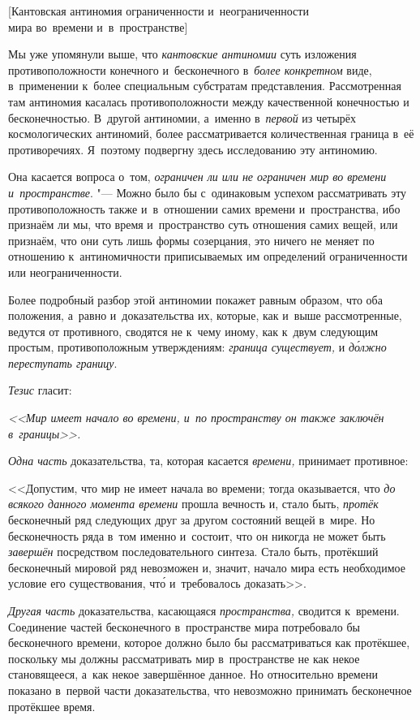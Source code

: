 %
{[Кантовская антиномия ограниченности и~неограниченности\nopagebreak\\
мира во~времени и~в~пространстве]}

Мы уже упомянули выше, что {\em кантовские антиномии} суть изложения
противоположности конечного и~бесконечного в~{\em более конкретном} виде,
в~применении к~более специальным субстратам представления. Рассмотренная там
антиномия касалась противоположности между качественной конечностью и
бесконечностью. В~другой антиномии, а~именно в~{\em первой} из четырёх
космологических антиномий, более рассматривается количественная граница в~её
противоречиях. Я~поэтому подвергну здесь исследованию эту антиномию.

Она касается вопроса о~том,
{\em ограничен ли или не ограничен мир во времени и~пространстве}. "--- Можно
было бы с~одинаковым успехом рассматривать эту противоположность также
и~в~отношении самих времени и~пространства, ибо признаём ли мы, что время
и~пространство суть отношения самих вещей, или признаём, что они суть лишь
формы созерцания, это ничего не меняет по отношению к~антиномичности
приписываемых им определений ограниченности или неограниченности.

Более подробный разбор этой антиномии покажет равным образом, что оба
положения, а~равно и~доказательства их, которые, как и~выше рассмотренные,
ведутся от противного, сводятся не к~чему иному, как к~двум следующим простым,
противоположным утверждениям: {\em граница существует,} и
{\em д\'{о}лжно переступать границу}.

{\em Тезис} гласит:

{\em <<Мир имеет начало во времени, и~по пространству он
также заключён в~границы>>.}

{\em Одна часть} доказательства, та, которая касается
{\em времени,} принимает противное:

<<Допустим, что мир не имеет начала во времени; тогда оказывается, что
{\em до всякого данного момента времени} прошла вечность и, стало быть,
{\em протёк} бесконечный ряд следующих друг за другом состояний вещей в~мире.
Но бесконечность ряда в~том именно и~состоит, что он никогда не может быть
{\em завершён} посредством последовательного синтеза. Стало быть, протёкший
бесконечный мировой ряд невозможен и, значит, начало мира есть необходимое
условие его существования, чт\'{о} и~требовалось доказать>>.

{\em Другая часть} доказательства, касающаяся {\em пространства,} сводится
к~времени. Соединение частей бесконечного в~пространстве мира потребовало бы
бесконечного времени, которое должно было бы рассматриваться как протёкшее,
поскольку мы должны рассматривать мир в~пространстве не как некое становящееся,
а~как некое завершённое данное. Но относительно времени показано в~первой части
доказательства, что невозможно принимать бесконечное протёкшее время.

